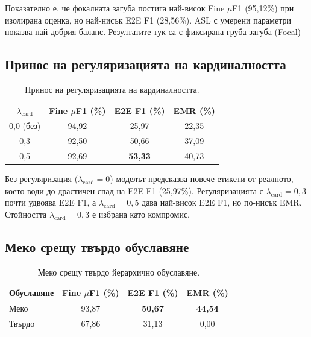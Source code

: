 \documentclass[12pt,a4paper]{report}
\begin{document}
Показателно е, че фокалната загуба постига най-висок Fine $\mu$F1 (95,12\%) при изолирана оценка, но най-нисък E2E F1 (28,56\%). ASL с умерени параметри показва най-добрия баланс. Резултатите тук са с фиксирана груба загуба (Focal)

\subsection{Принос на регуляризацията на кардиналността}
\label{sec:ablation_cardinality}

\begin{table}[H]
\centering
\caption{Принос на регуляризацията на кардиналността.}
\label{tab:ablation_cardinality}
\begin{tabular}{cccc}
\toprule
$\lambda_{\text{card}}$ & \textbf{Fine $\mu$F1 (\%)} & \textbf{E2E F1 (\%)} & \textbf{EMR (\%)} \\
\midrule
0,0 (без) & 94,92 & 25,97 & 22,35 \\
0,3 & 92,50 & 50,66 & 37,09 \\
0,5 & 92,69 & \textbf{53,33} & 40,73 \\
\bottomrule
\end{tabular}
\end{table}

Без регуляризация ($\lambda_{\text{card}}=0$) моделът предсказва повече етикети от реалното, което води до драстичен спад на E2E F1 (25,97\%). Регуляризацията с $\lambda_{\text{card}}=0{,}3$ почти удвоява E2E F1, а $\lambda_{\text{card}}=0{,}5$ дава най-висок E2E F1, но по-нисък EMR. Стойността $\lambda_{\text{card}}=0{,}3$ е избрана като компромис.

\subsection{Меко срещу твърдо обуславяне}
\label{sec:ablation_conditioning}

\begin{table}[H]
\centering
\caption{Меко срещу твърдо йерархично обуславяне.}
\label{tab:ablation_conditioning}
\begin{tabular}{lccc}
\toprule
\textbf{Обуславяне} & \textbf{Fine $\mu$F1 (\%)} & \textbf{E2E F1 (\%)} & \textbf{EMR (\%)} \\
\midrule
Меко & 93,87 & \textbf{50,67} & \textbf{44,54} \\
Твърдо & 67,86 & 31,13 & 0,00 \\
\bottomrule
\end{tabular}
\end{table}
\end{document}
